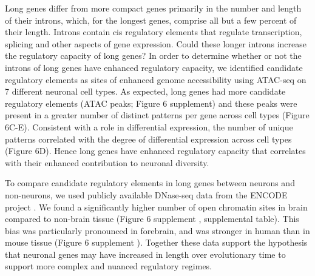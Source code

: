 Long genes differ from more compact genes primarily in the number and length of their introns, which, for the longest genes, comprise all but a few percent of their length. Introns contain cis regulatory elements that regulate transcription, splicing and other aspects of gene expression\cite{Rebollo_2012}\cite{Friedli_2015}. Could these longer introns increase the regulatory capacity of long genes? In order to determine whether or not the introns of long genes have enhanced regulatory capacity, we identified candidate regulatory elements as sites of enhanced genome accessibility using ATAC-seq \cite{Buenrostro_2013} on 7 different neuronal cell types. As expected, long genes had more candidate regulatory elements (ATAC peaks; Figure 6 supplement) and these peaks were present in a greater number of distinct patterns per gene across cell types (Figure 6C-E). Consistent with a role in differential expression, the number of unique patterns correlated with the degree of differential expression across cell types (Figure 6D). Hence long genes have enhanced regulatory capacity that correlates with their enhanced contribution to neuronal diversity.

To compare candidate regulatory elements in long genes between neurons and non-neurons, we used publicly available DNase-seq data from the ENCODE project \cite{Dunham_2012}. We found a significantly higher number of open chromatin sites in brain compared to non-brain tissue (Figure 6 supplement , supplemental table). This bias was  particularly pronounced in forebrain, and was stronger in human than in mouse tissue (Figure 6 supplement ). Together these data support the hypothesis that neuronal genes may have increased in length over evolutionary time to support more complex and nuanced regulatory regimes. 